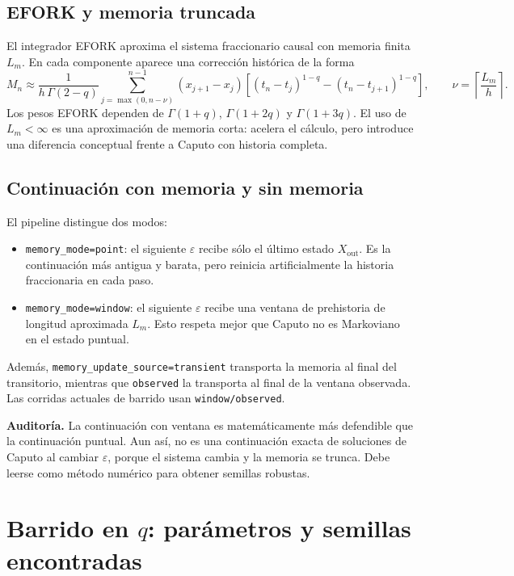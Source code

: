 \documentclass[11pt]{article}
\begin{document}
\subsection{EFORK y memoria truncada}

El integrador EFORK aproxima el sistema fraccionario causal con memoria finita
\(L_m\). En cada componente aparece una corrección histórica de la forma
\[
M_n \approx
\frac{1}{h\,\Gamma(2-q)}
\sum_{j=\max(0,n-\nu)}^{n-1}
\left(x_{j+1}-x_j\right)
\left[
(t_n-t_j)^{1-q}-(t_n-t_{j+1})^{1-q}
\right],
\qquad
\nu=\left\lceil\frac{L_m}{h}\right\rceil.
\]
Los pesos EFORK dependen de \(\Gamma(1+q)\), \(\Gamma(1+2q)\) y
\(\Gamma(1+3q)\). El uso de \(L_m<\infty\) es una aproximación de memoria
corta: acelera el cálculo, pero introduce una diferencia conceptual frente a
Caputo con historia completa.

\subsection{Continuación con memoria y sin memoria}

El pipeline distingue dos modos:
\begin{itemize}
\item \texttt{memory\_mode=point}: el siguiente \(\varepsilon\) recibe sólo el
último estado \(X_{\mathrm{out}}\). Es la continuación más antigua y barata,
pero reinicia artificialmente la historia fraccionaria en cada paso.
\item \texttt{memory\_mode=window}: el siguiente \(\varepsilon\) recibe una
ventana de prehistoria de longitud aproximada \(L_m\). Esto respeta mejor que
Caputo no es Markoviano en el estado puntual.
\end{itemize}
Además, \texttt{memory\_update\_source=transient} transporta la memoria al
final del transitorio, mientras que \texttt{observed} la transporta al final
de la ventana observada. Las corridas actuales de barrido usan
\texttt{window/observed}.

\textbf{Auditoría.} La continuación con ventana es matemáticamente más
defendible que la continuación puntual. Aun así, no es una continuación exacta
de soluciones de Caputo al cambiar \(\varepsilon\), porque el sistema cambia y
la memoria se trunca. Debe leerse como método numérico para obtener semillas
robustas.

\section{Barrido en \(q\): parámetros y semillas encontradas}
\end{document}
